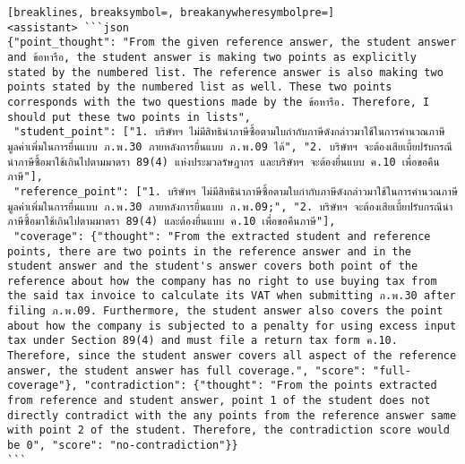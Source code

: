 \begin{Verbatim}[breaklines, breaksymbol=, breakanywheresymbolpre=]
<assistant> ```json
{"point_thought": "From the given reference answer, the student answer and ข้อหารือ, the student answer is making two points as explicitly stated by the numbered list. The reference answer is also making two points stated by the numbered list as well. These two points corresponds with the two questions made by the ข้อหารือ. Therefore, I should put these two points in lists",
 "student_point": ["1. บริษัทฯ ไม่มีสิทธินำภาษีซื้อตามใบกำกับภาษีดังกล่าวมาใช้ในการคำนวณภาษีมูลค่าเพิ่มในการยื่นแบบ ภ.พ.30 ภายหลังการยื่นแบบ ภ.พ.09 ได้", "2. บริษัทฯ จะต้องเสียเบี้ยปรับกรณีนำภาษีซื้อมาใช้เกินไปตามมาตรา 89(4) แห่งประมวลรัษฎากร และบริษัทฯ จะต้องยื่นแบบ ค.10 เพื่อขอคืนภาษี"],
 "reference_point": ["1. บริษัทฯ ไม่มีสิทธินำภาษีซื้อตามใบกำกับภาษีดังกล่าวมาใช้ในการคำนวณภาษีมูลค่าเพิ่มในการยื่นแบบ ภ.พ.30 ภายหลังการยื่นแบบ ภ.พ.09;", "2. บริษัทฯ จะต้องเสียเบี้ยปรับกรณีนำภาษีซื้อมาใช้เกินไปตามมาตรา 89(4) และต้องยื่นแบบ ค.10 เพื่อขอคืนภาษี"],
 "coverage": {"thought": "From the extracted student and reference points, there are two points in the reference answer and in the student answer and the student's answer covers both point of the reference about how the company has no right to use buying tax from the said tax invoice to calculate its VAT when submitting ภ.พ.30 after filing ภ.พ.09. Furthermore, the student answer also covers the point about how the company is subjected to a penalty for using excess input tax under Section 89(4) and must file a return tax form ค.10. Therefore, since the student answer covers all aspect of the reference answer, the student answer has full coverage.", "score": "full-coverage"}, "contradiction": {"thought": "From the points extracted from reference and student answer, point 1 of the student does not directly contradict with the any points from the reference answer same with point 2 of the student. Therefore, the contradiction score would be 0", "score": "no-contradiction"}}
```


\end{Verbatim}

